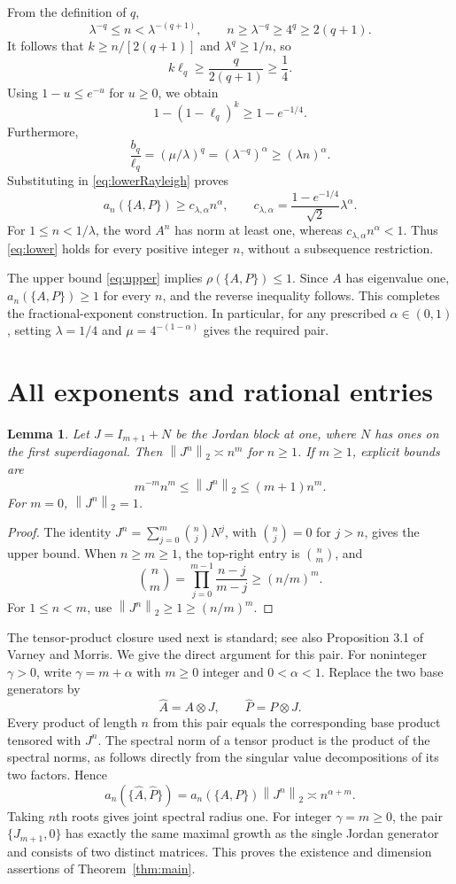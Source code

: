 \documentclass[11pt]{article}
\newtheorem{lemma}[theorem]{Lemma}
\theoremstyle{remark}\newtheorem{remark}[theorem]{Remark}
\newcommand{\norm}[1]{\left\lVert #1\right\rVert_2}
\newcommand{\jsr}{\rho}
\begin{document}
From the definition of $q$,
\[
 \lambda^{-q}\leq n<\lambda^{-(q+1)},\qquad
 n\geq\lambda^{-q}\geq4^q\geq2(q+1).
\]
It follows that $k\geq n/[2(q+1)]$ and $\lambda^q\geq1/n$, so
\[
 k\ell_q\geq\frac{q}{2(q+1)}\geq\frac14.
\]
Using $1-u\leq e^{-u}$ for $u\geq0$, we obtain
\[
 1-(1-\ell_q)^k\geq1-e^{-1/4}.
\]
Furthermore,
\[
 \frac{b_q}{\ell_q}=(\mu/\lambda)^q
  =(\lambda^{-q})^\alpha\geq(\lambda n)^\alpha.
\]
Substituting in \eqref{eq:lowerRayleigh} proves
\begin{equation}\label{eq:lower}
 a_n(\{A,P\})\geq c_{\lambda,\alpha}n^\alpha,
 \qquad c_{\lambda,\alpha}
       =\frac{1-e^{-1/4}}{\sqrt2}\lambda^\alpha.
\end{equation}
For $1\leq n<1/\lambda$, the word $A^n$ has norm at least one, whereas
$c_{\lambda,\alpha}n^\alpha<1$. Thus \eqref{eq:lower} holds for every positive integer $n$, without a subsequence restriction.

The upper bound \eqref{eq:upper} implies $\jsr(\{A,P\})\leq1$. Since $A$ has eigenvalue one, $a_n(\{A,P\})\geq1$ for every $n$, and the reverse inequality follows. This completes the fractional-exponent construction. In particular, for any prescribed $\alpha\in(0,1)$, setting $\lambda=1/4$ and $\mu=4^{-(1-\alpha)}$ gives the required pair.

\section{All exponents and rational entries}
\begin{lemma}\label{lem:Jordan}
Let $J=I_{m+1}+N$ be the Jordan block at one, where $N$ has ones on the first superdiagonal. Then $\norm{J^n}\asymp n^m$ for $n\geq1$. If $m\geq1$, explicit bounds are
\[
 m^{-m}n^m\leq\norm{J^n}\leq(m+1)n^m.
\]
For $m=0$, $\norm{J^n}=1$.
\end{lemma}
\begin{proof}
The identity $J^n=\sum_{j=0}^m\binom njN^j$, with $\binom nj=0$ for $j>n$, gives the upper bound. When $n\geq m\geq1$, the top-right entry is $\binom nm$, and
\[
 \binom nm=\prod_{j=0}^{m-1}\frac{n-j}{m-j}
           \geq(n/m)^m.
\]
For $1\leq n<m$, use $\norm{J^n}\geq1\geq(n/m)^m$.
\end{proof}

The tensor-product closure used next is standard; see also Proposition 3.1 of Varney and Morris. We give the direct argument for this pair. For noninteger $\gamma>0$, write $\gamma=m+\alpha$ with $m\geq0$ integer and $0<\alpha<1$. Replace the two base generators by
\[
 \widehat A=A\otimes J,\qquad \widehat P=P\otimes J.
\]
Every product of length $n$ from this pair equals the corresponding base product tensored with $J^n$. The spectral norm of a tensor product is the product of the spectral norms, as follows directly from the singular value decompositions of its two factors. Hence
\[
 a_n(\{\widehat A,\widehat P\})
  =a_n(\{A,P\})\norm{J^n}\asymp n^{\alpha+m}.
\]
Taking $n$th roots gives joint spectral radius one. For integer $\gamma=m\geq0$, the pair $\{J_{m+1},0\}$ has exactly the same maximal growth as the single Jordan generator and consists of two distinct matrices. This proves the existence and dimension assertions of Theorem~\ref{thm:main}.
\end{document}
